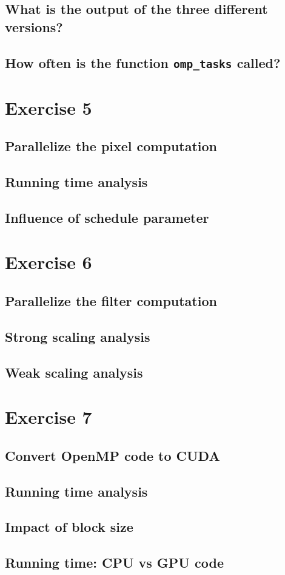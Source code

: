 \documentclass[a4paper,%
11pt,%
DIV12,
headsepline,%
headings=normal,
]{scrartcl}
\begin{document}
\subsection{What is the output of the three different versions?}

\subsection{How often is the function \texttt{omp\_tasks} called?}

\section{Exercise 5}

\subsection{Parallelize the pixel computation}

\subsection{Running time analysis}

\subsection{Influence of schedule parameter}

\section{Exercise 6}

\subsection{Parallelize the filter computation}

\subsection{Strong scaling analysis}

\subsection{Weak scaling analysis}

\section{Exercise 7}

\subsection{Convert OpenMP code to CUDA}

\subsection{Running time analysis}

\subsection{Impact of block size}

\subsection{Running time: CPU vs GPU code}
\end{document}
